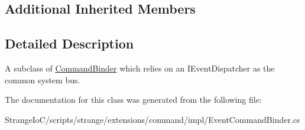 \subsection*{Additional Inherited Members}


\subsection{Detailed Description}
A subclass of \hyperlink{classstrange_1_1extensions_1_1command_1_1impl_1_1_command_binder}{Command\-Binder} which relies on an I\-Event\-Dispatcher as the common system bus. 

The documentation for this class was generated from the following file\-:\begin{DoxyCompactItemize}
\item 
Strange\-Io\-C/scripts/strange/extensions/command/impl/Event\-Command\-Binder.\-cs\end{DoxyCompactItemize}
